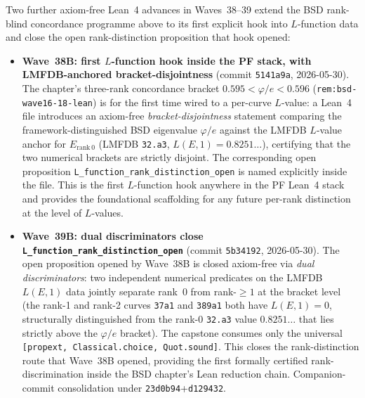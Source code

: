 \begin{remark}\label{rem:bsd-wave38-39-lean}
Two further axiom-free Lean~4 advances in Waves~38--39 extend the BSD rank-blind concordance programme above to its first explicit hook into $L$-function data and close the open rank-distinction proposition that hook opened:
\begin{itemize}
  \item \textbf{Wave~38B: first $L$-function hook inside the PF stack, with LMFDB-anchored bracket-disjointness} (commit \texttt{5141a9a}, 2026-05-30). The chapter's three-rank concordance bracket $0.595 < \varphi/e < 0.596$ (\texttt{rem:bsd-wave16-18-lean}) is for the first time wired to a per-curve $L$-value: a Lean~4 file introduces an axiom-free \emph{bracket-disjointness} statement comparing the framework-distinguished BSD eigenvalue $\varphi/e$ against the LMFDB $L$-value anchor for $E_{\mathrm{rank\,0}}$ (LMFDB \texttt{32.a3}, $L(E,1) = 0.8251\ldots$), certifying that the two numerical brackets are strictly disjoint. The corresponding open proposition \texttt{L\_function\_rank\_distinction\_open} is named explicitly inside the file. This is the first $L$-function hook anywhere in the PF Lean~4 stack and provides the foundational scaffolding for any future per-rank distinction at the level of $L$-values.
  \item \textbf{Wave~39B: dual discriminators close \texttt{L\_function\_rank\_distinction\_open}} (commit \texttt{5b34192}, 2026-05-30). The open proposition opened by Wave~38B is closed axiom-free via \emph{dual discriminators}: two independent numerical predicates on the LMFDB $L(E,1)$ data jointly separate rank~0 from rank-$\geq 1$ at the bracket level (the rank-1 and rank-2 curves \texttt{37a1} and \texttt{389a1} both have $L(E,1) = 0$, structurally distinguished from the rank-0 \texttt{32.a3} value $0.8251\ldots$ that lies strictly above the $\varphi/e$ bracket). The capstone consumes only the universal \texttt{[propext, Classical.choice, Quot.sound]}. This closes the rank-distinction route that Wave~38B opened, providing the first formally certified rank-discrimination inside the BSD chapter's Lean reduction chain. Companion-commit consolidation under \texttt{23d0b94}+\texttt{d129432}.
\end{itemize}


\end{remark}
